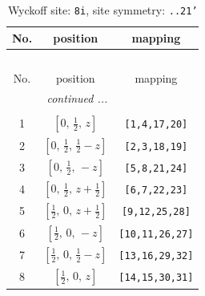\documentclass[fleqn,8pt]{jsarticle}
\begin{document}
\begin{longtable}{ccc}
\caption{Wyckoff site: {\tt 8i}, site symmetry: {\tt ..21'}}
 \\
 \hline \hline
No. & position & mapping \\ \hline \endfirsthead

\multicolumn{2}{l}{\tablename\ \thetable{}} \\
 \hline \hline
No. & position & mapping \\ \hline \endhead

 \hline \hline
\multicolumn{2}{r}{\footnotesize\it continued ...} \\ \endfoot

 \hline \hline
\multicolumn{2}{r}{} \\ \endlastfoot

1 & $\left[ 0,\, \frac{1}{2},\, z \right]$ & {\tt [1,4,17,20]} \\ \hline
2 & $\left[ 0,\, \frac{1}{2},\, \frac{1}{2} - z \right]$ & {\tt [2,3,18,19]} \\ \hline
3 & $\left[ 0,\, \frac{1}{2},\, - z \right]$ & {\tt [5,8,21,24]} \\ \hline
4 & $\left[ 0,\, \frac{1}{2},\, z + \frac{1}{2} \right]$ & {\tt [6,7,22,23]} \\ \hline
5 & $\left[ \frac{1}{2},\, 0,\, z + \frac{1}{2} \right]$ & {\tt [9,12,25,28]} \\ \hline
6 & $\left[ \frac{1}{2},\, 0,\, - z \right]$ & {\tt [10,11,26,27]} \\ \hline
7 & $\left[ \frac{1}{2},\, 0,\, \frac{1}{2} - z \right]$ & {\tt [13,16,29,32]} \\ \hline
8 & $\left[ \frac{1}{2},\, 0,\, z \right]$ & {\tt [14,15,30,31]} \\
\end{longtable}
\renewcommand{\arraystretch}{1.2}
\end{document}
